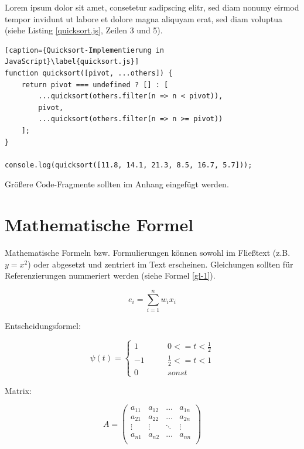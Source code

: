 Lorem ipsum dolor sit amet, consetetur sadipscing elitr, sed diam nonumy eirmod tempor invidunt ut labore et dolore magna aliquyam erat, sed diam voluptua (siehe Listing \ref{quicksort.js}, Zeilen 3 und 5).

\begin{lstlisting}[caption={Quicksort-Implementierung in JavaScript}\label{quicksort.js}]
function quicksort([pivot, ...others]) {
	return pivot === undefined ? [] : [
		...quicksort(others.filter(n => n < pivot)),
		pivot,
		...quicksort(others.filter(n => n >= pivot))
	];
}

console.log(quicksort([11.8, 14.1, 21.3, 8.5, 16.7, 5.7]));
\end{lstlisting}

Größere Code-Fragmente sollten im Anhang eingefügt werden. \cite{wiki:listing}

\section{Mathematische Formel}

Mathematische Formeln bzw. Formulierungen können sowohl im Fließtext (z.B. $y=x^2$) oder abgesetzt und zentriert im Text erscheinen. Gleichungen sollten für Referenzierungen nummeriert werden (siehe Formel \ref{gl-1}).

\begin{equation}
	\label{gl-1}
	e_{i}=\sum _{i=1}^{n}w_{i}x_{i}
\end{equation}

Entscheidungsformel:

\begin{equation}
	\psi(t)=\left\{\begin{array}{ccc}
		1 & \qquad 0 <= t < \frac{1}{2} \\
		-1 & \qquad \frac{1}{2} <= t <1 \\
		0 & \qquad sonst
	\end{array} \right.
\end{equation}

Matrix:

\begin{equation}
A = \left(
	\begin{array}{llll}
		a_{11} & a_{12} & \ldots & a_{1n} \\
		a_{21} & a_{22} & \ldots & a_{2n} \\
		\vdots & \vdots & \ddots & \vdots \\
		a_{n1} & a_{n2} & \ldots & a_{nn} \\
	\end{array}
\right)
\end{equation}

